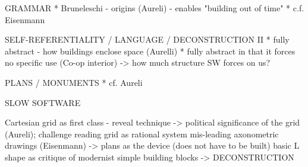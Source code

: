 GRAMMAR
* Bruneleschi - origins (Aureli) - enables "building out of time"
* c.f. Eisenmann

SELF-REFERENTIALITY / LANGUAGE / DECONSTRUCTION II
* fully abstract - how buildings enclose space (Aurelli)
* fully abstract in that it forces no specific use (Co-op interior)
-> how much structure SW forces on us?

PLANS / MONUMENTS
* cf. Aureli


SLOW SOFTWARE

Cartesian grid as first class - reveal technique
-> political significance of the grid (Aureli); challenge reading grid as rational system
mis-leading axonometric drawings (Eisenmann)
-> plans as the device (does not have to be built)
basic L shape as critique of modernist simple building blocks
-> DECONSTRUCTION

\theendnotes
